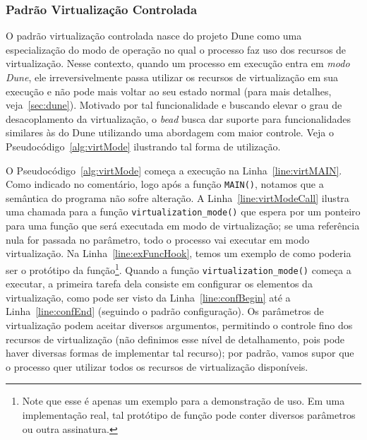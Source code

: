 \subsubsection{Padrão Virtualização Controlada}
\label{sec:virtctl}

O padrão virtualização controlada nasce do projeto Dune como uma especialização
do modo de operação no qual o processo faz uso dos recursos de virtualização.
Nesse contexto, quando um processo em execução entra em \emph{modo Dune}, ele
irreversivelmente passa utilizar os recursos de virtualização em sua execução e
não pode mais voltar ao seu estado normal (para mais detalhes,
veja~\ref{sec:dune}). Motivado por tal funcionalidade e buscando elevar o grau
de desacoplamento da virtualização, o \emph{bead} busca dar suporte para
funcionalidades similares às do Dune utilizando uma abordagem com maior
controle. Veja o Pseudocódigo~\ref{alg:virtMode} ilustrando tal forma de
utilização.



O Pseudocódigo~\ref{alg:virtMode} começa a execução na
Linha~\ref{line:virtMAIN}. Como indicado no comentário, logo após a função
\texttt{MAIN()}, notamos que a semântica do programa não sofre alteração. A
Linha~\ref{line:virtModeCall} ilustra uma chamada para a função
\texttt{virtualization\_mode()} que espera por um ponteiro para uma função que
será executada em modo de virtualização; se uma referência nula for passada no
parâmetro, todo o processo vai executar em modo virtualização. Na
Linha~\ref{line:exFuncHook}, temos um exemplo de como poderia ser o
protótipo da função\footnote{Note que esse é apenas um exemplo para a
demonstração de uso. Em uma implementação real, tal protótipo de função pode
conter diversos parâmetros ou outra assinatura.}. Quando a função
\texttt{virtualization\_mode()} começa a executar, a primeira tarefa dela
consiste em configurar os elementos da virtualização, como pode ser visto da
Linha~\ref{line:confBegin} até a Linha~\ref{line:confEnd} (seguindo o padrão
configuração). Os parâmetros de virtualização podem aceitar diversos argumentos,
permitindo o controle fino dos recursos de virtualização (não definimos esse
nível de detalhamento, pois pode haver diversas formas de implementar tal
recurso); por padrão, vamos supor que o processo quer utilizar todos os
recursos de virtualização disponíveis.

